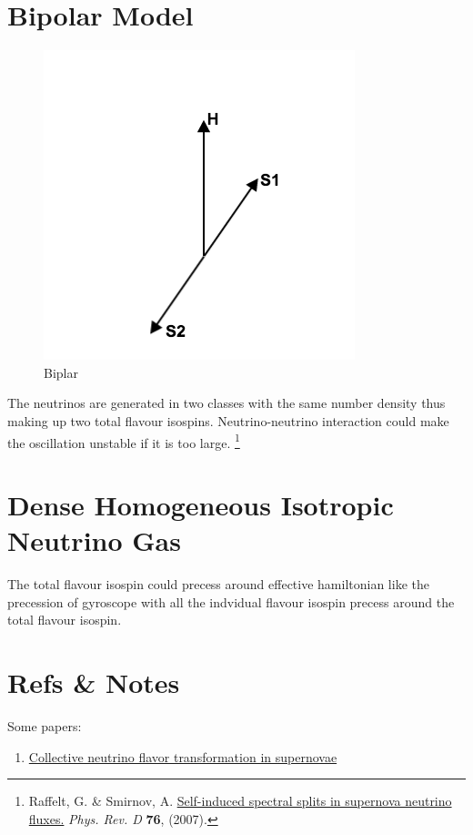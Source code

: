 \documentclass[letterpaper,12pt,english]{sphinxmanual}
\begin{document}
\section{Bipolar Model}
\label{collective:bipolar-model}\label{collective:index-1}\begin{figure}[htbp]
\centering
\capstart

\includegraphics{bipolar.png}
\caption{Biplar}\end{figure}

The neutrinos are generated in two classes with the same number density thus making up two total flavour isospins. Neutrino-neutrino interaction could make the oscillation unstable if it is too large. \footnote{
Raffelt, G. \& Smirnov, A. \href{http://journals.aps.org/prd/abstract/10.1103/PhysRevD.74.105010}{Self-induced spectral splits in supernova neutrino fluxes.} \emph{Phys. Rev. D} \textbf{76}, (2007).
}


\section{Dense Homogeneous Isotropic Neutrino Gas}
\label{collective:dense-homogeneous-isotropic-neutrino-gas}\label{collective:index-2}
The total flavour isospin could precess around effective hamiltonian like the precession of gyroscope with all the indvidual flavour isospin precess around the total flavour isospin.


\section{Refs \& Notes}
\label{collective:refs-notes}
Some papers:
\begin{enumerate}
\item {} 
\href{http://link.aps.org/pdf/10.1103/PhysRevD.74.123004}{Collective neutrino flavor transformation in supernovae}

\end{enumerate}
\end{document}
